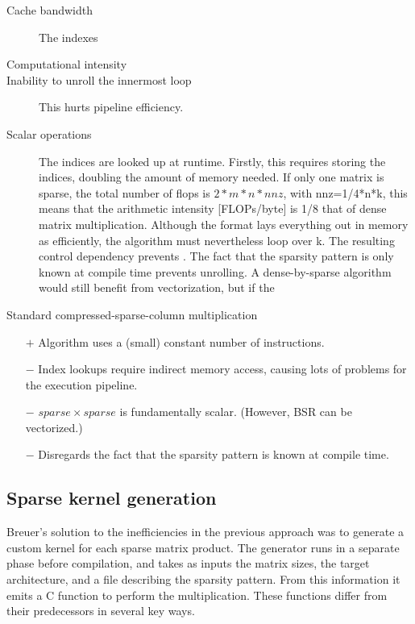       \begin{description}
        \item[Cache bandwidth] The indexes 
        \item[Computational intensity]
        \item[Inability to unroll the innermost loop] This hurts pipeline efficiency.
        \item[Scalar operations]

        The indices are looked up at runtime. Firstly, this requires storing the indices, doubling the amount of memory needed. If only one matrix is sparse, the total number of flops is $2 * m * n * nnz$, with nnz=1/4*n*k, this means that the arithmetic intensity [FLOPs/byte] is 1/8 that of dense matrix multiplication. 
        Although the format lays everything out in memory as efficiently, the algorithm must nevertheless loop over k. The resulting control dependency prevents . The fact that the sparsity pattern is only known at compile time prevents unrolling. 
        A dense-by-sparse algorithm would still benefit from vectorization, but if the 

      \end{description}


      Standard compressed-sparse-column multiplication
        \begin{itemize}
          \item[$+$] Algorithm uses a (small) constant number of instructions.
          \item[$-$] Index lookups require indirect memory access, causing lots of problems for the execution pipeline.
          \item[$-$] $sparse \times sparse$ is fundamentally scalar. (However, BSR can be vectorized.)
          \item[$-$] Disregards the fact that the sparsity pattern is known at compile time.
        \end{itemize}




\subsection{Sparse kernel generation}
    
      Breuer's solution to the inefficiencies in the previous approach was to generate a custom kernel for each sparse matrix product. The generator runs in a separate phase before compilation, and takes as inputs the matrix sizes, the target architecture, and a file describing the sparsity pattern. From this information it emits a C function to perform the multiplication. These functions differ from their predecessors in several key ways. 


